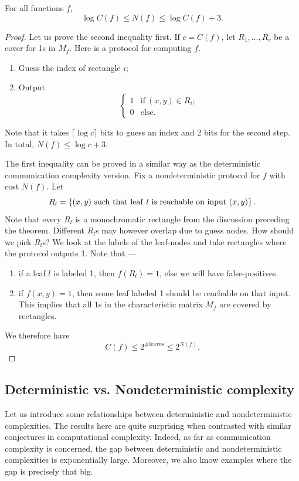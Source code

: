 \documentclass[letterpaper]{article}
\providecommand\cbrac[1]{\ensuremath \left\{#1\right\}}
\newcommand{\mf}{M_f}
\newcommand{\nf}{N(f)}
\newcommand{\cf}{C(f)}
\begin{document}
\begin{theorem}
For all functions $f$,
$$
\log \cf \leq \nf \leq \log \cf + 3.
$$
\end{theorem}
\begin{proof}
Let us prove the second inequality first. If $c = \cf$, let $R_1, \ldots, R_c$ be a cover for 1s in $\mf$. Here is a protocol for computing $f$.
\begin{enumerate}
    \item Guess the index of rectangle $i$;
    \item Output
        $$
            \begin{cases}
            1 & \mathrm{if}\ (x,y) \in R_i;\\
            0 & \mathrm{else.}
            \end{cases}
         $$
\end{enumerate}
Note that it takes $\lceil \log c \rceil$ bits to guess an index and 2 bits for the second step. In total, $\nf \leq \log c + 3$.

The first inequality can be proved in a similar way as the deterministic communication complexity version. Fix a nondeterministic protocol for $f$ with cost $\nf$. Let
$$
R_l = \cbrac{ (x,y)\ \mathrm{such\ that\ leaf}\ l\ \mathrm{is\ reachable\ on\ input}\ (x,y) }.
$$
Note that every $R_l$ is a monochromatic rectangle from the discussion preceding the theorem. Different $R_l$s may however overlap due to guess nodes. How should we pick $R_l$s? We look at the labels of the leaf-nodes and take rectangles where the protocol outputs 1. Note that ---
\begin{enumerate}
    \item if a leaf $l$ is labeled 1, then $f(R_l) = 1$, else we will have false-positives.
    \item if $f(x,y) = 1$, then some leaf labeled 1 should be reachable on that input. This implies that all $1$s in the characteristic matrix $\mf$ are covered by rectangles.
\end{enumerate}
We therefore have
$$
\cf \leq 2^{\# \mathrm{leaves}} \leq 2^{\nf}.
$$
\end{proof}


\subsection{Deterministic vs. Nondeterministic complexity}

Let us introduce some relationships between deterministic and nondeterministic complexities. The results here are quite surprising when contrasted with similar conjectures in computational complexity. Indeed, as far as communication complexity is concerned, the gap between deterministic and nondeterministic complexities is exponentially large. Moreover, we also know examples where the gap is precisely that big.
\end{document}
